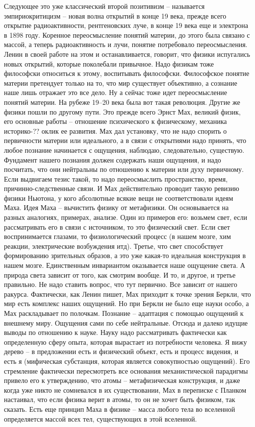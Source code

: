 \documentclass[a4paper, 12pt]{article}
\begin{document}
Следующее это уже классический второй позитивизм -- называется 
эмпириокритицизм -- новая волна открытий в конце 19 века, прежде всего 
открытие радиоактивности, рентгеновских луче, в конце 19 века еще 
и электрона в 1898 году. Коренное переосмысление понятий материи, до 
этого была связано с массой, а теперь радиоактивность и лучи, понятие 
потребовало переосмысления. Ленин в своей работе на этом 
и останавливается, говорит, что физики испугались новых открытий, 
которые поколебали привычное. Надо физикам тоже философски относиться 
к этому, воспитывать философски. Философское понятие материи претендует 
только на то, что мир существует объективно, а сознание наше лишь 
отражает это все дело. Ну а сейчас тоже идет переосмысление понятий 
материи. На рубеже 19--20 века была вот такая революция. Другие же 
физики пошли по другому пути. Это прежде всего Эрнст Мах, великий физик, 
его основные работы -- отношение психического к физическому, механика 
историко-?? оклик ее развития. Мах дал установку, что не надо спорить 
о первичности материи или идеального, а в связи с открытиями надо 
принять, что любое познание начинается с ощущения, наблюдаю, 
следовательно, существую. Фундамент нашего познания должен содержать 
наши ощущения, и надо посчитать, что они нейтральны по отношению 
к материи или духу первичному. Если выдвигаем тезис такой, то надо 
переосмыслить пространство, время, причинно-следственные связи. И Мах 
действительно проводит такую ревизию физики Ньютона, у кого абсолютные 
всякие вещи не соответствовали идеям Маха. Идея Маха -- вычистить физику 
от метафизики. Он основывается на разных аналогиях, примерах, анализе. 
Один из примеров его: возьмем свет, если рассматривать его в связи 
с источником, то это физический свет. Если свет воспринимается глазами, 
то физиологический процесс (в нашем мозге, хим реакции, электрические 
возбуждения итд). Третье, что свет способствует формированию зрительных 
образов, а это уже какая-то идеальная конструкция в нашем мозге. 
Единственным инвариантом оказывается наше ощущение света. А природа 
света зависит от того, как смотрим вообще. И то, и другое, и третье 
правильно. Не надо ставить вопрос, что тут первично. Все зависит от 
нашего ракурса. Фактически, как Ленин пишет, Мах приходит к точке зрения 
Беркли, что мир есть комплекс наших ощущений. Но при Беркли не было еще 
науки особо, а Мах раскладывает по полочкам. Познание -- адаптация 
с помощью ощущений к внешнему миру. Ощущения сами по себе нейтральные. 
Отсюда и далеко идущие выводы по отношению к науке. Науку надо 
рассматривать фактически как определенную сферу опыта, которая вырастает 
из потребности человека. Я вижу дерево -- в предложении есть 
и физический объект, есть и процесс видения, и есть я (мифическая 
субстанция, которая является совокупностью ощущений). Его стремление 
фактически пересмотреть все основания механистической парадигмы привело 
его к утверждению, что атомы -- метафизическая конструкция, и даже когда 
уже никто не сомневался в их существовании, Мах в переписке с Планком 
настаивал, что если физика верит в атомы, то он не хочет быть физиком, 
так сказать. Есть еще принцип Маха в физике -- масса любого тела во 
вселенной определяется массой всех тел, существующих в этой вселенной.
\end{document}
